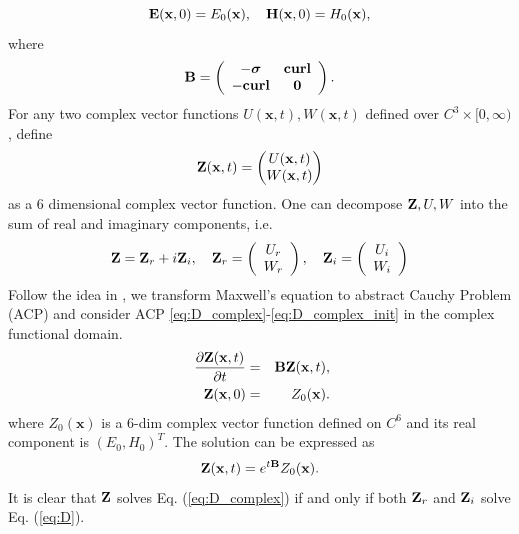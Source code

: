 \documentclass[10pt,reqno]{amsart}
\newcommand{\bS}{\boldsymbol{\sigma}}
\renewcommand{\(}{\left(}
\renewcommand{\)}{\right)}
\newcommand{\HH}{{\bf H}}
\newcommand{\EE}{{\bf E}}
\newcommand{\CU}{{\bf curl}}
\newcommand{\BB}{{\bf B}}
\newcommand{\ZZ}{{\bf Z}}
\newcommand{\bx}{\mathbf{x}}
\numberwithin{equation}{section}
\begin{document}
\begin{equation}\label{eq:D-init}
	\EE(\bx,0) =  E_0(\bx), \quad  \HH(\bx,0) =  H_0(\bx),
\end{equation}
where
\[
\BB= \left(
\begin{array}{cc}
	-\bS & \CU\\
	-\CU & \mathbf{0} \\
\end{array}
\right).
\] 
For any two complex vector functions $U(\bx,t),W(\bx,t)$ defined over $C^3\times [0,\infty)$, define
\[
\ZZ(\bx,t)=
\begin{pmatrix}
	U(\bx,t)  \\
	W(\bx,t)
\end{pmatrix}
\]
as a $6$ dimensional complex vector function. One can decompose $\ZZ, U, W$ into the sum of real and imaginary components, i.e. 
\[
\ZZ=\ZZ_r + i\ZZ_i,   \quad \ZZ_r= \left(
\begin{array}{c}
	 U_r\\
	W_r
\end{array}
\right),  \quad \ZZ_i=\left(
\begin{array}{c}
	U_i\\
	W_i
\end{array}
\right)
\]
Follow the idea in \cite{zou_maxwell}, we transform Maxwell's equation to abstract Cauchy Problem (ACP) and consider ACP \ref{eq:D_complex}-\ref{eq:D_complex_init} in the complex functional domain. 
\begin{eqnarray}
	\frac{\partial \ZZ(\bx, t)}{ \partial t} &=& \BB \ZZ(\bx, t),   \label{eq:D_complex} \\
	\quad \ZZ(\bx,0) &=& Z_{0}(\bx).   \label{eq:D_complex_init}   
\end{eqnarray}
where $Z_0(\bx)$ is a $6$-dim complex vector function defined on  $C^6$ and its real component is $(E_0,H_0)^T$. The solution can be expressed as \cite{engel_nagel}
\[
\ZZ(\bx, t) = e^{t\BB}Z_{0}(\bx).
\]
It is clear that $\ZZ$ solves Eq. (\ref{eq:D_complex}) if and only if both $\ZZ_r$ and $\ZZ_i$ solve Eq. (\ref{eq:D}). 
\end{document}
